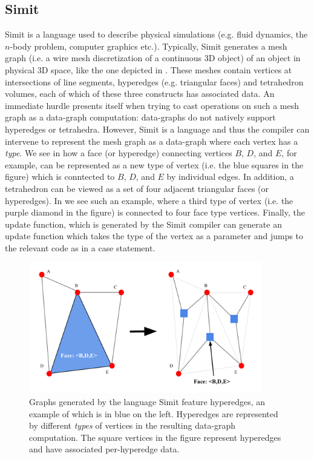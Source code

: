 \subsection{Simit}

Simit is a language used to describe physical simulations 
(e.g. fluid dynamics, the $n$-body problem, computer graphics etc.).
Typically, Simit generates a mesh graph (i.e. a wire mesh discretization
of a continuous 3D object) of an object in 
physical 3D space, like the one depicted in .  
These meshes contain vertices at intersections of line segments, 
hyperedges (e.g. triangular faces) and tetrahedron volumes, each of which of
these three constructs has associated data.  An immediate hurdle
presents itself when trying to cast operations on such a mesh graph
as a data-graph computation: data-graphs do not natively support
hyperedges or tetrahedra.  However, Simit is a language and thus
the compiler can intervene to represent the mesh graph as a data-graph
where each vertex has a \emph{type}.  We see in 
how a face (or hyperedge) connecting vertices $B$, $D$, and $E$, for example, 
can be represented as a new type of vertex (i.e. the blue squares
in the figure) which is conntected to $B$, $D$, and
$E$ by individual edges.  In addition, a tetrahedron can be 
viewed as a set of four adjacent triangular faces (or hyperedges).  In 
 we see such an example, where a third type
of vertex (i.e. the purple diamond in the figure) is connected 
to four face type vertices.  Finally, the update function, which
is generated by the Simit compiler can generate an update function
which takes the type of the vertex as a parameter and jumps
to the relevant code as in a case statement.

\begin{figure}[]
\centering
\includegraphics[width=4in]{figures/hyperedge.pdf}
\caption{Graphs generated by the language Simit feature hyperedges, an example
of which is in blue on the left.  Hyperedges are represented by different
\emph{types} of vertices in the resulting data-graph computation.
The square vertices in the figure represent hyperedges and have associated
per-hyperedge data.}
\label{fig:hyperedge}
\end{figure}


